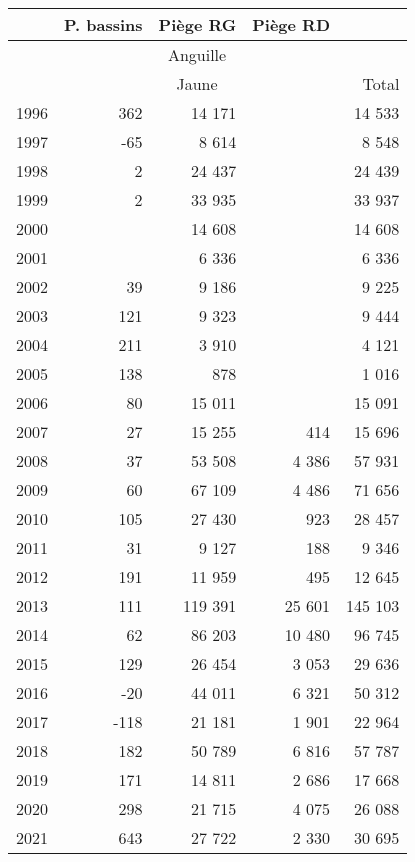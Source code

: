 \begin{table}[ht]
\centering
\begin{tabular}{lrrrr}
  \hline
   & \multicolumn{1}{c}{P. bassins} & \multicolumn{1}{c}{Piège RG} & \multicolumn{1}{c}{Piège RD} & \\
 \hline
  & \multicolumn{3}{c}{Anguille} & \\
 \hline
  & \multicolumn{3}{c}{Jaune} & Total\\
 \hline
1996 & 362 & 14 171 &  & 14 533 \\ 
  1997 & -65 & 8 614 &  & 8 548 \\ 
  1998 & 2 & 24 437 &  & 24 439 \\ 
  1999 & 2 & 33 935 &  & 33 937 \\ 
  2000 &  & 14 608 &  & 14 608 \\ 
  2001 &  & 6 336 &  & 6 336 \\ 
  2002 & 39 & 9 186 &  & 9 225 \\ 
  2003 & 121 & 9 323 &  & 9 444 \\ 
  2004 & 211 & 3 910 &  & 4 121 \\ 
  2005 & 138 & 878 &  & 1 016 \\ 
  2006 & 80 & 15 011 &  & 15 091 \\ 
  2007 & 27 & 15 255 & 414 & 15 696 \\ 
  2008 & 37 & 53 508 & 4 386 & 57 931 \\ 
  2009 & 60 & 67 109 & 4 486 & 71 656 \\ 
  2010 & 105 & 27 430 & 923 & 28 457 \\ 
  2011 & 31 & 9 127 & 188 & 9 346 \\ 
  2012 & 191 & 11 959 & 495 & 12 645 \\ 
  2013 & 111 & 119 391 & 25 601 & 145 103 \\ 
  2014 & 62 & 86 203 & 10 480 & 96 745 \\ 
  2015 & 129 & 26 454 & 3 053 & 29 636 \\ 
  2016 & -20 & 44 011 & 6 321 & 50 312 \\ 
  2017 & -118 & 21 181 & 1 901 & 22 964 \\ 
  2018 & 182 & 50 789 & 6 816 & 57 787 \\ 
  2019 & 171 & 14 811 & 2 686 & 17 668 \\ 
  2020 & 298 & 21 715 & 4 075 & 26 088 \\ 
  2021 & 643 & 27 722 & 2 330 & 30 695 \\ 

\end{tabular}
\end{table}
